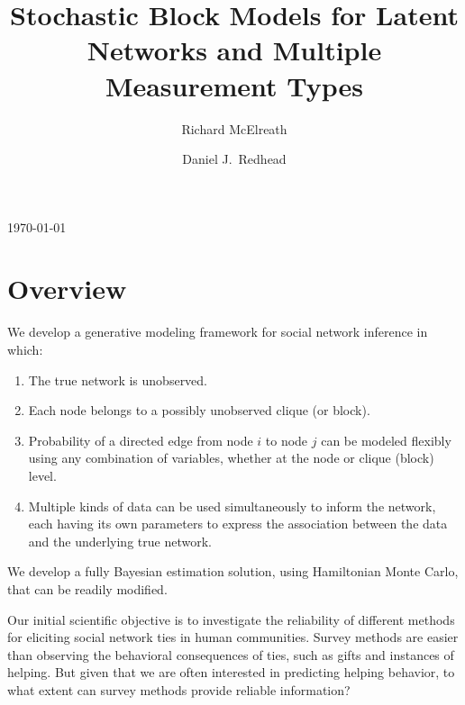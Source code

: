 \documentclass[reqno,12pt,a4paper]{amsart}
\begin{document}
\title[SBMs with Multiple Types of Data]{Stochastic Block Models for Latent Networks and Multiple Measurement Types}
\author{Richard McElreath \and Daniel J.~Redhead}
\address{Department of Human Behavior, Ecology and Culture, Max Planck Institute for Evolutionary Anthropology, Leipzig, Germany}


\maketitle

{\vspace{-6pt}\footnotesize\begin{center}\today\end{center}\vspace{12pt}}

\linenumbers
\modulolinenumbers[3]



\section{Overview}

We develop a generative modeling framework for social network inference in which:
\begin{enumerate}
\item The true network is unobserved.
\item Each node belongs to a possibly unobserved clique (or block).
\item Probability of a directed edge from node $i$ to node $j$ can be modeled flexibly using any combination of variables, whether at the node or clique (block) level.
\item Multiple kinds of data can be used simultaneously to inform the network, each having its own parameters to express the association between the data and the underlying true network.
\end{enumerate}
We develop a fully Bayesian estimation solution, using Hamiltonian Monte Carlo, that can be readily modified.

Our initial scientific objective is to investigate the reliability of different methods for eliciting social network ties in human communities. Survey methods are easier than observing the behavioral consequences of ties, such as gifts and instances of helping. But given that we are often interested in predicting helping behavior, to what extent can survey methods provide reliable information?
\end{document}
